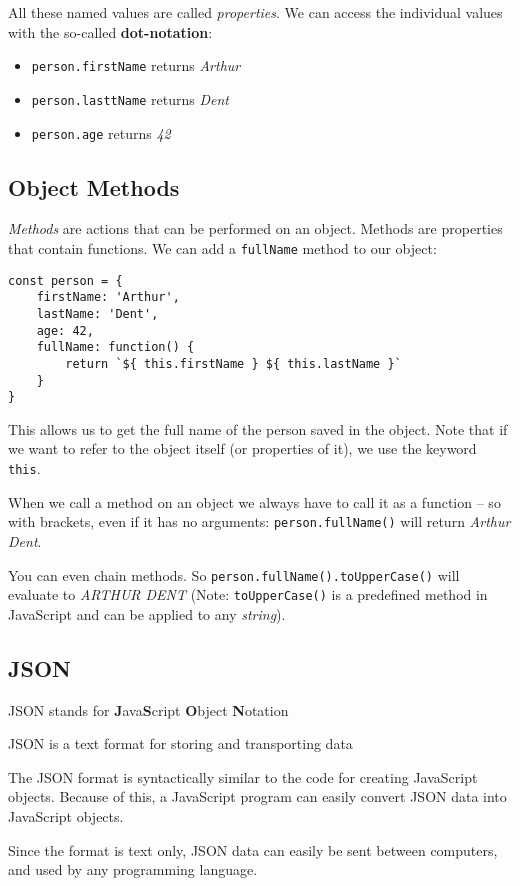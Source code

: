 \documentclass[english,11pt,a4paper]{report}
\begin{document}
All these named values are called \emph{properties}. We can access the individual values with the so-called {\bf dot-notation}: 
\begin{itemize}
\item \verb|person.firstName| returns \emph{Arthur}
\item \verb|person.lasttName| returns \emph{Dent}
\item \verb|person.age| returns \emph{42}
\end{itemize}

\subsection{Object Methods}

\emph{Methods} are actions that can be performed on an object. Methods are properties that contain functions. We can add a \verb|fullName| method to our object:
\begin{verbatim}
const person = {
    firstName: 'Arthur', 
    lastName: 'Dent', 
    age: 42,
    fullName: function() {
        return `${ this.firstName } ${ this.lastName }`
    }
}
\end{verbatim}

This allows us to get the full name of the person saved in the object. Note that if we want to refer to the object itself (or properties of it), we use the keyword \verb|this|. 

When we call a method on an object we always have to call it as a function -- so with brackets, even if it has no arguments: \verb|person.fullName()| will return \emph{Arthur Dent}.

You can even chain methods. So \verb|person.fullName().toUpperCase()| will evaluate to \emph{ARTHUR DENT} (Note: \verb|toUpperCase()| is a predefined method in JavaScript and can be applied to any \emph{string}).

\subsection{JSON} 
JSON stands for {\bf J}ava{\bf S}cript {\bf O}bject {\bf N}otation

JSON is a text format for storing and transporting data

The JSON format is syntactically similar to the code for creating JavaScript objects. Because of this, a JavaScript program can easily convert JSON data into JavaScript objects.

Since the format is text only, JSON data can easily be sent between computers, and used by any programming language.
\end{document}
